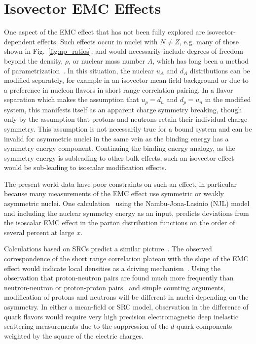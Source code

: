 \section{Isovector EMC Effects\label{sec:ivemc}}
%
One aspect of the EMC effect that has not been fully explored are isovector-dependent effects.  Such effects occur in nuclei with $N \neq Z$, e.g. many of those shown in Fig.~\ref{fig:np_ratios}, and would necessarily include degrees of freedom beyond the density, $\rho$, or nuclear mass number $A$, which has long been a method of parametrization~\cite{Malace:2014uea}.  In this situation, the nuclear $u_A$ and $d_A$ distributions can be modified separately, for example in an isovector mean field background or due to a preference in nucleon flavors in short range correlation pairing.  In a flavor separation which makes the assumption that $u_p = d_n$ and $d_p = u_n$ in the modified system, this manifests itself as an apparent charge symmetry breaking, though only by the assumption that protons and neutrons retain their individual charge symmetry. This assumption is not necessarily true for a bound system and can be invalid for asymmetric nuclei in the same vein as the binding energy has a symmetry energy component.  Continuing the binding energy analogy, as the symmetry energy is subleading to other bulk effects, such an isovector effect would be sub-leading to isoscalar modification effects.

The present world data have poor constraints on such an effect, in particular because many measurements of the EMC effect use symmetric or weakly asymmetric nuclei. One calculation~\cite{Cloet:2009qs,Cloet:2012td} using the Nambu-Jona-Lasinio (NJL) model and including the nuclear symmetry energy as an input, predicts deviations from the isoscalar EMC effect in the parton distribution functions on the order of several percent at large $x$.

Calculations based on SRCs predict a similar picture~\cite{Sargsian:2012sm, Arrington:2015wja}.  The observed correspondence of the short range correlation plateau with the slope of the EMC effect would indicate local densities as a driving mechanism~\cite{Weinstein:2010rt}.  Using the observation that proton-neutron pairs are found much more frequently than neutron-neutron or proton-proton pairs~\cite{Subedi:2008zz} and simple counting arguments, modification of protons and neutrons will be different in nuclei depending on the asymmetry.  In either a mean-field or SRC model, observation in the difference of quark flavors would require very high precision electromagnetic deep inelastic scattering measurements due to the suppression of the $d$ quark components weighted by the square of the electric charges. 

